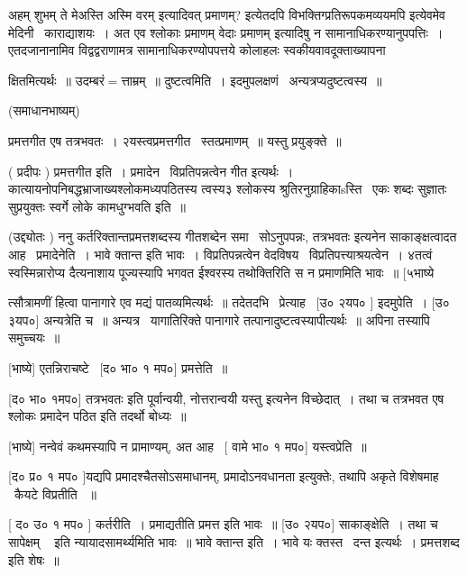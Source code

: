 \documentclass[11pt, openany]{book}
\begin{document}
{\qt अहम् शुभम् ते मेअस्ति अस्मि वरम्} इत्यादिवत् {\qt प्रमाणम्?}
इत्येतदपि विभक्तिग्प्रतिरूपकमव्ययमपि इत्येवमेव मेदिनी \textendash\ काराद्याशयः~। अत
एव श्लोकाः प्रमाणम् {\qt वेदाः प्रमाणम्} इत्यादिषु न
सामानाधिकरण्यानुपपत्तिः~। एतदजानानामिव विद्वद्वराणामत्र
सामानाधिकरण्योपपत्तये कोलाहलः स्वकीयवावदूक्ताख्यापना \textendash\ 





क्षितमित्यर्थः~॥ उदम्बरं$=$त्ताम्रम्~॥ दुष्टत्वमिति~। इदमुपलक्षणं \textendash\ 
अन्यत्रप्यदुष्टत्वस्य~॥

 (समाधानभाष्यम्)

 प्रमत्तगीत एष तत्रभवतः~। २यस्त्वप्रमत्तगीत \textendash\ स्तत्प्रमाणम्~॥ यस्तु
प्रयुङ्क्ते~॥ 

 ( प्रदीपः ) प्रमत्तगीत इति~। प्रमादेन \textendash\ विप्रतिपन्नत्वेन गीत इत्यर्थः~। 
कात्यायनोपनिबद्धभ्राजाख्यश्लोकमध्यपठितस्य त्वस्य३ श्लोकस्य
श्रुतिरनुग्राहिकाsस्ति \textendash\ {\qt एकः शब्दः सुज्ञातः सुप्रयुक्तः स्वर्गे लोके
कामधुग्भवति} इति~॥

 (उद्द्योतः ) ननु कर्तरिक्तान्तप्रमत्तशब्दस्य गीतशब्देन समा \textendash\ 
सोऽनुपपन्नः, {\qt तत्रभवतः} इत्यनेन साकाङ्क्षत्वादत आह \textendash\ प्रमादेनेति~। भावे
क्तान्त इति भावः~। विप्रतिपन्नत्वेन वेदविषय \textendash\ विप्रतिपत्त्याश्रयत्वेन~। 
४तत्वं स्वस्मिन्नारोप्य दैत्यनाशाय पूज्यस्यापि भगवत ईश्वरस्य तथोक्तिरिति
स न प्रमाणमिति भावः~॥ [५भाष्ये \textendash\ 



त्सौत्रामणीं हित्वा पानागारे एव मद्यं पातव्यमित्यर्थः~॥ तदेतदभि \textendash\ 
प्रेत्याह \textendash\ [उ० २यप० ] इदमुपेति~। [उ० ३यप०] अन्यत्रेति च~॥
अन्यत्र \textendash\ यागातिरिक्ते पानागारे तत्पानादुष्टत्वस्यापीत्यर्थः~॥ अपिना
तस्यापि समुच्चयः~॥ 

 [भाष्ये] एतन्निराचष्टे \textendash\ [द० भा० १ मप०] प्रमत्तेति~॥ 

 [द० भा० १मप०] {\qt तत्रभवतः} इति पूर्वान्वयी, नोत्तरान्वयी {\qt यस्तु}
इत्यनेन विच्छेदात्~। तथा च तत्रभवत एष श्लोकः प्रमादेन पठित इति तदर्थो
बोध्यः~॥ 

 [भाष्ये] नन्वेवं कथमस्यापि न प्रामाण्यम्, अत आह \textendash\ [ वामे भा० १
मप०] यस्त्वप्रेति~॥ 

 [द० प्र० १ मप० ]यद्यपि प्रमादश्चैतसोऽसमाधानम्,
{\qt प्रमादोऽनवधानता} इत्युक्तेः, तथापि अकृते विशेषमाह \textendash\ कैयटे विप्रतीति
~॥ 

 [ द० उ० १ मप० ] कर्तरीति~। प्रमाद्यतीति प्रमत्त इति भावः~॥
[उ० २यप०] साकाङ्क्षेति~। तथा च {\qt सापेक्षम् \textendash\ } इति
न्यायादसामर्थ्यमिति भावः~॥ भावे क्तान्त इति~। भावे यः क्तस्त \textendash\ दन्त
इत्यर्थः~। प्रमत्तशब्द इति शेषः~॥ 
\end{document}
